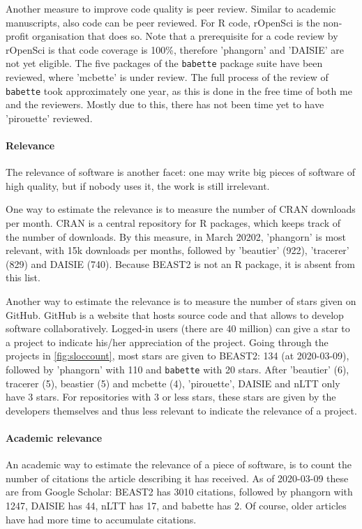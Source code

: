 Another measure to improve code quality is peer review. Similar to
academic manuscripts, also code can be peer reviewed. 
For R code, rOpenSci is the non-profit organisation that does so.
Note that a prerequisite for a code review by rOpenSci is that code coverage is 100\%,
therefore 'phangorn' and 'DAISIE' are not yet eligible.
The five packages of the \verb;babette; package suite have been reviewed, 
where 'mcbette' is under review. 
The full process of the review of \verb;babette; took approximately one year,
as this is done in the free time of both me and the reviewers.
Mostly due to this, there has not been time yet to have 'pirouette' reviewed.

\paragraph{Relevance}

The relevance of software is another facet: one may write big pieces
of software of high quality, but if nobody uses it, the work is 
still irrelevant.

One way to estimate the relevance is to measure the number of CRAN downloads
per month. CRAN is a central repository for R packages, which keeps
track of the number of downloads. By this measure, in March 20202,
'phangorn' is most relevant, with 15k downloads per months, followed 
by 'beautier' (922), 'tracerer' (829) and DAISIE (740). Because BEAST2
is not an R package, it is absent from this list.

Another way to estimate the relevance is to measure the number of stars
given on GitHub. GitHub is a website that hosts source code
and that allows to develop software collaboratively.
Logged-in users (there are 40 million) can give a star to a project
to indicate his/her appreciation of the project.
Going through the projects in \ref{fig:sloccount}, most stars
are given to BEAST2: 134 (at 2020-03-09), followed
by 'phangorn' with 110 and \verb;babette; with 20 stars.
After 'beautier' (6), tracerer (5), beastier (5)
and mcbette (4), 'pirouette', DAISIE and nLTT only have 3 stars.
For repositories with 3 or less stars, these stars are given by
the developers themselves and thus less relevant to indicate
the relevance of a project.

\paragraph{Academic relevance}

An academic way to estimate the relevance of a piece of software,
is to count the number of citations the article describing it
has received. As of 2020-03-09 these are from Google Scholar:
BEAST2 \cite{bouckaert2014beast} has 3010 citations,
followed by phangorn \cite{schliep2011phangorn} with 1247,
DAISIE \cite{valente2014effects} has 44, 
nLTT \cite{janzen2015approximate} has 17,
and babette \cite{bilderbeek2018babette} has 2. 
Of course, older articles have had more time to accumulate citations.

